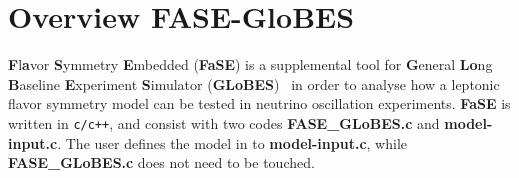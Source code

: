 \documentclass[aps,prd,nofootinbib,preprint]{revtex4}
\begin{document}


\section{Overview FASE-GloBES}

\textbf{F}l\textbf{a}vor \textbf{S}ymmetry \textbf{E}mbedded (\textbf{FaSE}) is a supplemental tool for \textbf{G}eneral \textbf{Lo}ng \textbf{B}aseline \textbf{E}xperiment \textbf{S}imulator (\textbf{GLoBES})~\cite{Huber:2004ka,Huber:2007ji} in order to analyse how a leptonic flavor symmetry model can be tested in neutrino oscillation experiments. \textbf{FaSE} is written in \texttt{c/c++}, and consist with two codes \textbf{FASE\_GLoBES.c} and \textbf{model-input.c}. The user defines the model in to \textbf{model-input.c}, while \textbf{FASE\_GLoBES.c} does not need to be touched. 
\end{document}
